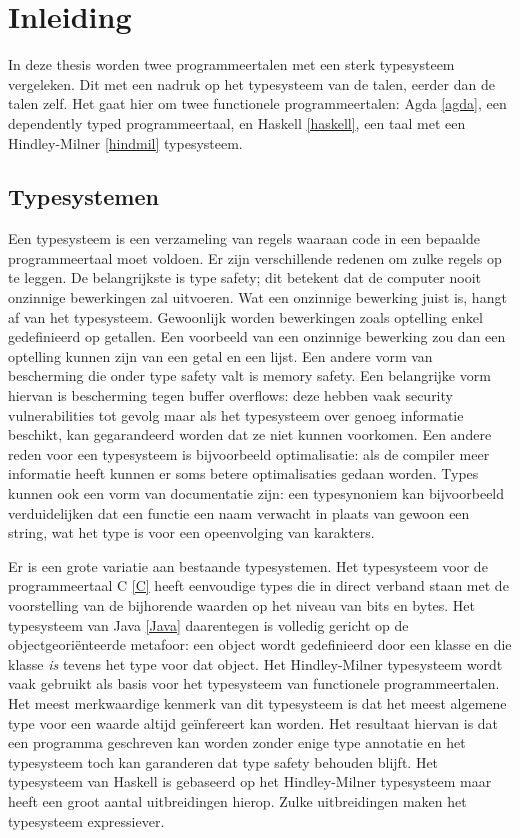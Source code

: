 \chapter{Inleiding}
\label{inleiding}

In deze thesis worden twee programmeertalen met een sterk typesysteem
vergeleken. Dit met een nadruk op het typesysteem van de talen, eerder dan de
talen zelf. Het gaat hier om twee functionele programmeertalen: Agda
\ref{agda}, een dependently typed programmeertaal, en Haskell \ref{haskell},
een taal met een Hindley-Milner \ref{hindmil} typesysteem.


\section{Typesystemen}

Een typesysteem is een verzameling van regels waaraan code in een bepaalde
programmeertaal moet voldoen. Er zijn verschillende redenen om zulke regels op
te leggen. De belangrijkste is type safety; dit betekent dat de computer nooit
onzinnige bewerkingen zal uitvoeren. Wat een onzinnige bewerking juist is,
hangt af van het typesysteem. Gewoonlijk worden bewerkingen zoals optelling
enkel gedefinieerd op getallen. Een voorbeeld van een onzinnige bewerking zou
dan een optelling kunnen zijn van een getal en een lijst. Een andere vorm van
bescherming die onder type safety valt is memory safety. Een belangrijke vorm
hiervan is bescherming tegen buffer overflows: deze hebben vaak security
vulnerabilities tot gevolg maar als het typesysteem over genoeg informatie
beschikt, kan gegarandeerd worden dat ze niet kunnen voorkomen.  Een andere
reden voor een typesysteem is bijvoorbeeld optimalisatie: als de compiler meer
informatie heeft kunnen er soms betere optimalisaties gedaan worden. Types
kunnen ook een vorm van documentatie zijn: een typesynoniem kan bijvoorbeeld
verduidelijken dat een functie een naam verwacht in plaats van gewoon een
string, wat het type is voor een opeenvolging van karakters.

Er is een grote variatie aan bestaande typesystemen. Het typesysteem voor de
programmeertaal C \ref{C} heeft eenvoudige types die in direct verband staan
met de voorstelling van de bijhorende waarden op het niveau van bits en bytes.
Het typesysteem van Java \ref{Java} daarentegen is volledig gericht op de
objectgeoriënteerde metafoor: een object wordt gedefinieerd door een klasse en
die klasse \emph{is} tevens het type voor dat object. Het Hindley-Milner
typesysteem wordt vaak gebruikt als basis voor het typesysteem van functionele
programmeertalen. Het meest merkwaardige kenmerk van dit typesysteem is dat het
meest algemene type voor een waarde altijd geïnfereert kan worden. Het
resultaat hiervan is dat een programma geschreven kan worden zonder enige type
annotatie en het typesysteem toch kan garanderen dat type safety behouden
blijft. Het typesysteem van Haskell is gebaseerd op het Hindley-Milner
typesysteem maar heeft een groot aantal uitbreidingen hierop. Zulke
uitbreidingen maken het typesysteem expressiever.


